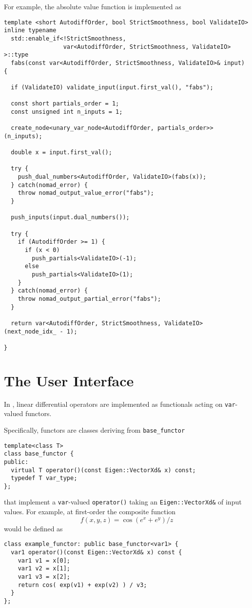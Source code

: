 For example, the absolute value function is implemented as
%
\begin{verbatim}
template <short AutodiffOrder, bool StrictSmoothness, bool ValidateIO>
inline typename 
  std::enable_if<!StrictSmoothness, 
                 var<AutodiffOrder, StrictSmoothness, ValidateIO> >::type
  fabs(const var<AutodiffOrder, StrictSmoothness, ValidateIO>& input) {
    
  if (ValidateIO) validate_input(input.first_val(), "fabs");
      
  const short partials_order = 1;
  const unsigned int n_inputs = 1;
    
  create_node<unary_var_node<AutodiffOrder, partials_order>>(n_inputs);

  double x = input.first_val();
    
  try {
    push_dual_numbers<AutodiffOrder, ValidateIO>(fabs(x));
  } catch(nomad_error) {
    throw nomad_output_value_error("fabs");
  }
      
  push_inputs(input.dual_numbers());
    
  try {
    if (AutodiffOrder >= 1) {
      if (x < 0)
        push_partials<ValidateIO>(-1);
      else
        push_partials<ValidateIO>(1);
    }
  } catch(nomad_error) {
    throw nomad_output_partial_error("fabs");
  }

  return var<AutodiffOrder, StrictSmoothness, ValidateIO>(next_node_idx_ - 1);
    
}
\end{verbatim}

\section{The \nomad User Interface}
\label{sec:user_interface}

In \nomad, linear differential operators are implemented as functionals acting
on \verb|var|-valued functors.

Specifically, functors are classes deriving from \verb|base_functor|
%
\begin{verbatim}
template<class T>
class base_functor {
public:
  virtual T operator()(const Eigen::VectorXd& x) const;
  typedef T var_type;
};
\end{verbatim}
%
that implement a \verb|var|-valued \verb|operator()| taking an
\verb|Eigen::VectorXd&| of input values.  For example, at
first-order the composite function
%
\begin{equation*}
f \! \left( x, y, z \right) = \cos \! \left( e^{x} + e^{y} \right) / z
\end{equation*}
%
would be defined as
%
\begin{verbatim}
class example_functor: public base_functor<var1> {
  var1 operator()(const Eigen::VectorXd& x) const {
    var1 v1 = x[0];
    var1 v2 = x[1];
    var1 v3 = x[2];
    return cos( exp(v1) + exp(v2) ) / v3;  
  }
};
\end{verbatim}

